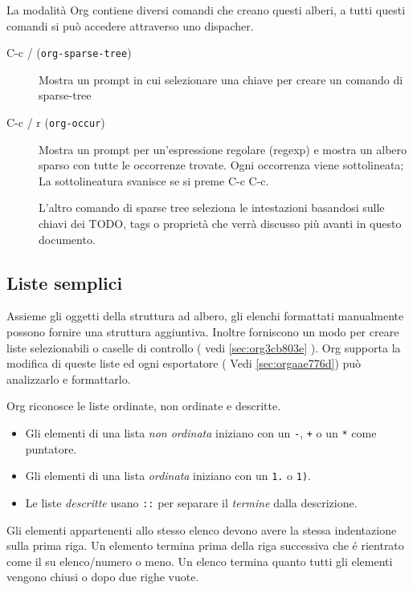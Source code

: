 \documentclass[11pt]{article}
\begin{document}
La modalità Org contiene diversi comandi che creano questi alberi, a tutti
questi comandi si può accedere attraverso uno dispacher.

\begin{description}
\item[{C-c / (\texttt{org-sparse-tree})}] Mostra un prompt in cui selezionare una chiave per creare un comando di
sparse-tree

\item[{C-c / r (\texttt{org-occur})}] Mostra un prompt per un'espressione regolare (regexp) e mostra un albero
sparso con tutte le occorrenze trovate. Ogni occorrenza viene
sottolineata; La sottolineatura svanisce se si preme C-c C-c.

L'altro comando di sparse tree seleziona le intestazioni basandosi sulle
chiavi dei TODO, tags o proprietà che verrà discusso più avanti in questo
documento.
\end{description}

\subsection{Liste semplici}
\label{sec:org462886b}
Assieme gli oggetti della struttura ad albero, gli elenchi formattati
manualmente possono fornire una struttura aggiuntiva. Inoltre
forniscono un modo per creare liste selezionabili o caselle di
controllo ( vedi \ref{sec:org3cb803e} ). Org supporta la modifica di queste
liste ed ogni esportatore ( Vedi \ref{sec:orgaae776d}) può analizzarlo e
formattarlo.

Org riconosce le liste ordinate, non ordinate e descritte.

\begin{itemize}
\item Gli elementi di una lista \emph{non ordinata} iniziano con un \texttt{-}, \texttt{+} o
un \texttt{*} come puntatore.
\item Gli elementi di una lista \emph{ordinata} iniziano con un \texttt{1.} o \texttt{1)}.
\item Le liste \emph{descritte} usano \texttt{::} per separare il \emph{termine} dalla
descrizione.
\end{itemize}

Gli elementi appartenenti allo stesso elenco devono avere la stessa
indentazione sulla prima riga. Un elemento termina prima della riga
successiva che é rientrato come il su elenco/numero o meno. Un elenco
termina quanto tutti gli elementi vengono chiusi o dopo due righe
vuote.
\end{document}
